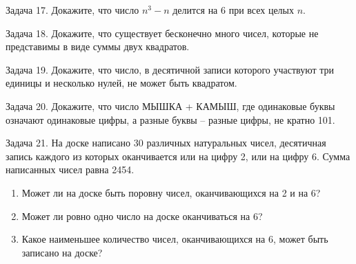 \documentclass[12pt]{article}
\begin{document}
Задача 17. Докажите, что число $n^3-n$ делится на 6 при всех целых $n$.     

Задача 18. Докажите, что существует бесконечно много чисел, которые не  представимы в
виде суммы двух квадратов.

Задача 19. Докажите, что число, в десятичной записи которого участвуют три единицы и
несколько нулей, не может быть квадратом.

Задача 20. Докажите,   что   число  МЫШКА + КАМЫШ,   где   одинаковые   буквы   означают
одинаковые цифры, а разные буквы – разные цифры,  не кратно 101.

Задача 21. На доске написано 30 различных натуральных чисел, десятичная запись каждого из которых оканчивается или на цифру 2, или на цифру 6. Сумма написанных чисел равна 2454.
\begin{enumerate}
	\item Может ли на доске быть поровну чисел, оканчивающихся на 2 и на 6?
	\item Может ли ровно одно число на доске оканчиваться на 6?
	\item Какое наименьшее количество чисел, оканчивающихся на 6, может быть записано на доске?
\end{enumerate}
	
\end{document}
